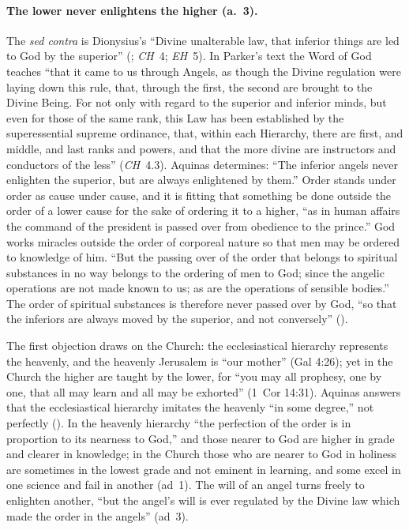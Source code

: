 \paragraph{The lower never enlightens the higher (a.~3).} The \emph{sed
contra} is Dionysius's ``Divine unalterable law, that inferior things are
led to God by the superior'' (;
\emph{CH}~4; \emph{EH}~5). In Parker's text the Word of God teaches ``that
it came to us through Angels, as though the Divine regulation were laying
down this rule, that, through the first, the second are brought to the
Divine Being. For not only with regard to the superior and inferior minds,
but even for those of the same rank, this Law has been established by the
superessential supreme ordinance, that, within each Hierarchy, there are
first, and middle, and last ranks and powers, and that the more divine are
instructors and conductors of the less'' (\emph{CH}~4.3). Aquinas
determines: ``The inferior angels never enlighten the superior, but are
always enlightened by them.'' Order stands under order as cause under cause,
and it is fitting that something be done outside the order of a lower cause
for the sake of ordering it to a higher, ``as in human affairs the command
of the president is passed over from obedience to the prince.'' God works
miracles outside the order of corporeal nature so that men may be ordered to
knowledge of him. ``But the passing over of the order that belongs to
spiritual substances in no way belongs to the ordering of men to God; since
the angelic operations are not made known to us; as are the operations of
sensible bodies.'' The order of spiritual substances is therefore never
passed over by God, ``so that the inferiors are always moved by the
superior, and not conversely'' ().

The first objection draws on the Church: the ecclesiastical hierarchy
represents the heavenly, and the heavenly Jerusalem is ``our mother'' (Gal
4:26); yet in the Church the higher are taught by the lower, for ``you may
all prophesy, one by one, that all may learn and all may be exhorted'' (1~Cor
 14:31). Aquinas answers that the ecclesiastical hierarchy imitates the
heavenly ``in some degree,'' not perfectly (). In the heavenly hierarchy ``the
perfection of the order is in proportion to its nearness to God,'' and those
nearer to God are higher in grade and clearer in knowledge; in the Church
those who are nearer to God in holiness are sometimes in the lowest grade and
not eminent in learning, and some excel in one science and fail in another
(ad~1). The will of an angel turns freely to enlighten another, ``but the
angel's will is ever regulated by the Divine law which made the order in the
angels'' (ad~3).

